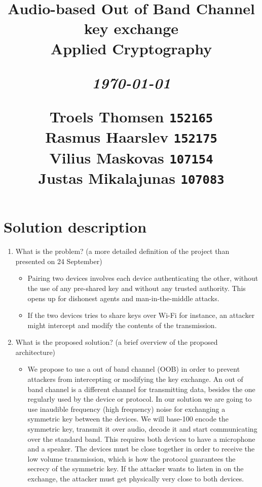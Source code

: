 \documentclass[12pt]{article}
\title{
  \vspace{4cm}
  \begin{flushleft}
  \Large{\textbf{Audio-based Out of Band Channel key exchange}} \\
  \large{Applied Cryptography}
  \end{flushleft}
  \vspace{0cm}
  \begin{flushleft}
  \small
  \textit{\today}
  \end{flushleft}
  \vspace{12cm}
  \begin{flushleft}
  \small
  Troels Thomsen \texttt{152165} \\
  Rasmus Haarslev \texttt{152175} \\
  Vilius Maskovas \texttt{107154} \\
  Justas Mikalajunas \texttt{107083}\\
  \end{flushleft}
}
\date{
}
\begin{document}
\clearpage
{}
\thispagestyle{empty}
\maketitle

\newpage

\tableofcontents

\newpage


\section{Solution description}
\label{sec:Solution description}

\begin{enumerate}
    \item What is the problem?  (a more detailed definition of the project than presented on 24 September)

    \begin{itemize}
        \item Pairing two devices involves each device authenticating the other, without the use of any pre-shared key and without any trusted authority. This opens up for dishonest agents and man-in-the-middle attacks.
        \item If the two devices tries to share keys over Wi-Fi for instance, an attacker might intercept and modify the contents of the transmission.
    \end{itemize}

    \item What is the proposed solution? (a brief overview of the proposed architecture)

    \begin{itemize}
        \item We propose to use a out of band channel (OOB) in order to prevent attackers from intercepting or modifying the key exchange. An out of band channel is a different channel for transmitting data, besides the one regularly used by the device or protocol. In our solution we are going to use inaudible frequency (high frequency) noise for exchanging a symmetric key between the devices.
        We will base-100 encode the symmetric key, transmit it over audio, decode it and start communicating over the standard band.
        This requires both devices to have a microphone and a speaker.
        The devices must be close together in order to receive the low volume transmission, which is how the protocol guarantees the secrecy of the symmetric key. If the attacker wants to listen in on the exchange, the attacker must get physically very close to both devices.
    \end{itemize}


\end{enumerate}
\end{document}
